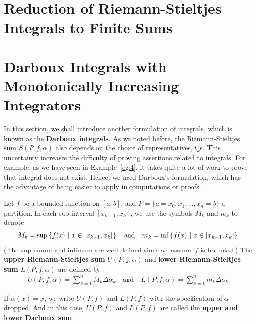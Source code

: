 \documentclass[thmcnt=section, 12pt]{my-elegantbook}
\begin{document}

\section{Reduction of Riemann-Stieltjes Integrals to Finite Sums}



\section{Darboux Integrals with Monotonically Increasing Integrators}

In this section, we shall introduce another formulation of integrals, which is known as the \textbf{Darboux integrals}. As we noted before, the Riemann-Stieltjes sum $S(P,f,\alpha)$ also depends on the choice of representatives, $ t_k$s. This uncertainty increases the difficulty of proving assertions related to integrals. For example, as we have seen in Example~\ref{eg:4}, it takes quite a lot of work to prove that integral does not exist. Hence, we need Darboux's formulation, which has the advantage of being easier to apply in computations or proofs. 

\begin{definition} \label{def:2}
    Let $f$ be a bounded function on $[a, b]$, and $P = \{a=x_0, x_1, \ldots, x_n=b\}$ a partition. In each sub-interval $[x_{k-1}, x_k]$, we use the symbols $M_k$ and $m_k$ to denote
    \begin{align*}
        M_k = \sup\left\{ f(x) \ \middle| \ x \in [x_{k-1}, x_k] \right\}
        \quad\text{and}\quad
        m_k = \inf\left\{ f(x) \ \middle| \ x \in [x_{k-1}, x_k] \right\}
    \end{align*}
    (The supremum and infimum are well-defined since we assume $f$ is bounded.) The \textbf{upper Riemann-Stieltjes sum} $U(P,f,\alpha)$ and \textbf{lower Riemann-Stieltjes sum} $L(P,f,\alpha)$ are defined by 
    \begin{align*}
        U(P,f,\alpha) = \sum_{k=1}^n M_k \Delta \alpha_k 
        \quad\text{and}\quad
        L(P,f,\alpha) = \sum_{k=1}^n m_k \Delta \alpha_k 
    \end{align*}
\end{definition}

If $\alpha(x) = x$, we write $U(P,f)$ and $L(P,f)$ with the specification of $\alpha$ dropped. And in this case, $U(P,f)$ and $L(P,f)$ are called the \textbf{upper and lower Darboux sum}.
\end{document}
